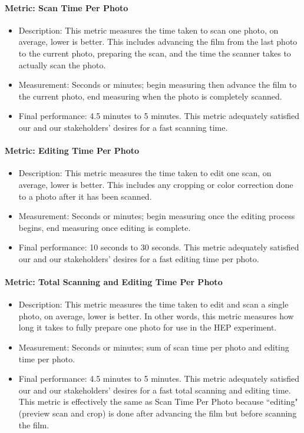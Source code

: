 \documentclass[12pt]{article} %
\begin{document}
\paragraph{Metric: Scan Time Per Photo} 
\begin{itemize}
    \item Description: This metric measures the time taken to scan one photo, on average, lower is better. This includes advancing the film from the last photo to the current photo, preparing the scan, and the time the scanner takes to actually scan the photo.
    \item Measurement: Seconds or minutes; begin measuring then advance the film to the current photo, end measuring when the photo is completely scanned.
    \item Final performance: 4.5 minutes to 5 minutes. This metric adequately satisfied our and our stakeholders' desires for a fast scanning time.
\end{itemize}

\paragraph{Metric: Editing Time Per Photo} 
\begin{itemize}
    \item Description: This metric measures the time taken to edit one scan, on average, lower is better. This includes any cropping or color correction done to a photo after it has been scanned.
    \item Measurement: Seconds or minutes; begin measuring once the editing process begins, end measuring once editing is complete.
    \item Final performance: 10 seconds to 30 seconds. This metric adequately satisfied our and our stakeholders' desires for a fast editing time per photo.
\end{itemize}

\paragraph{Metric: Total Scanning and Editing Time Per Photo} 
\begin{itemize}
    \item Description: This metric measures the time taken to edit and scan a single photo, on average, lower is better. In other words, this metric measures how long it takes to fully prepare one photo for use in the HEP experiment. 
    \item Measurement: Seconds or minutes; sum of scan time per photo and editing time per photo.
    \item Final performance: 4.5 minutes to 5 minutes. This metric adequately satisfied our and our stakeholders' desires for a fast total scanning and editing time. This metric is effectively the same as Scan Time Per Photo because ``editing" (preview scan and crop) is done after advancing the film but before scanning the film.
\end{itemize}
\end{document}
